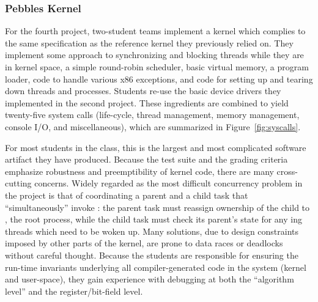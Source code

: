 \subsubsection{Pebbles Kernel}
For the fourth project, two-student teams
implement a kernel which complies to the
same specification as the reference kernel
they previously relied on.
They implement some approach to
synchronizing and blocking threads while
they are in kernel space,
a simple round-robin scheduler,
basic virtual memory,
a program loader,
code to handle various x86 exceptions,
and code for setting up and tearing down
threads and processes.
Students re-use the basic device drivers
they implemented in the second project.
These ingredients are combined to yield
twenty-five system calls
(life-cycle, thread management, memory management,
console I/O, and miscellaneous),
which are summarized in Figure~\ref{fig:syscalls}.

For most students in the class, this is the
largest and most complicated software artifact they
have produced.
Because the test suite and the grading criteria
emphasize robustness and preemptibility of
kernel code,
there are many cross-cutting concerns.
%
Widely regarded as the most difficult concurrency problem in the project
is that of coordinating a parent and a child task that ``simultaneously''
invoke : the parent task must reassign ownership of the child to
, the root process, while the child task must check its parent's state
for any ing threads which need to be woken up.
Many solutions, due to design constraints imposed by other parts of the kernel,
are prone to data races or deadlocks without careful thought.
%
Because the students are responsible for ensuring
the run-time invariants underlying all compiler-generated
code in the system (kernel and user-space),
they gain experience with debugging at both the
``algorithm level'' and the register/bit-field level.

